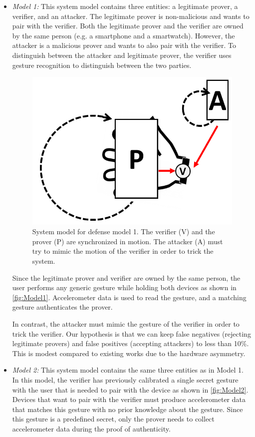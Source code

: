 \begin{itemize}
\item \emph{Model 1:} This system model contains three entities: a legitimate prover, a verifier, and an attacker. The legitimate prover is non-malicious and wants to pair with the verifier. Both the legitimate prover and the verifier are owned by the same person (e.g. a smartphone and a smartwatch). However, the attacker is a malicious prover and wants to also pair with the verifier. To distinguish between the attacker and legitimate prover, the verifier uses gesture recognition to distinguish between the two parties. 

\begin{figure}[!tb]
\centering
\includegraphics[width=0.65 \linewidth]{./figures/model1.png}
\caption{System model for defense model 1. The verifier (V) and the prover (P) are synchronized in motion. The attacker (A) must try to mimic the motion of the verifier in order to trick the system.}
\label{fig:Model1}
\end{figure}

Since the legitimate prover and verifier are owned by the same person, the user performs any generic gesture while holding both devices as shown in \autoref{fig:Model1}. Accelerometer data is used to read the gesture, and a matching gesture authenticates the prover.

In contrast, the attacker must mimic the gesture of the verifier in order to trick the verifier. Our hypothesis is that we can keep false negatives (rejecting legitimate provers) and false positives (accepting attackers) to less than 10\%. This is modest compared to existing works due to the hardware asymmetry.  

\item \emph{Model 2:} This system model contains the same three entities as in Model 1. In this model, the verifier has previously calibrated a single secret gesture with the user that is needed to pair with the device as shown in \autoref{fig:Model2}. Devices that want to pair with the verifier must produce accelerometer data that matches this gesture with no prior knowledge about the gesture. Since this gesture is a predefined secret, only the prover needs to collect accelerometer data during the proof of authenticity.


\end{itemize}
